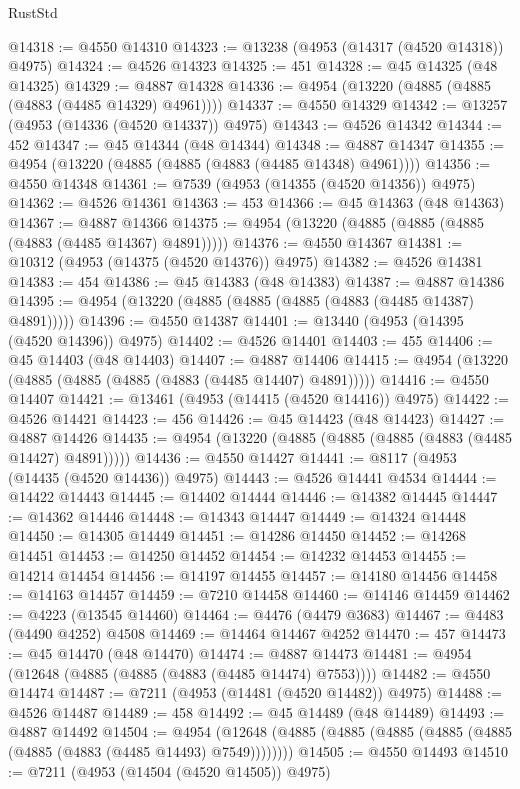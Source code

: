 \begin{lexlean}{RustStd}
\begin{coremodule}
@14318 := @4550 @14310
@14323 := @13238 (@4953 (@14317 (@4520 @14318)) @4975)
@14324 := @4526 @14323
@14325 := 451
@14328 := @45 @14325 (@48 @14325)
@14329 := @4887 @14328
@14336 := @4954 (@13220 (@4885 (@4885 (@4883 (@4485 @14329) @4961))))
@14337 := @4550 @14329
@14342 := @13257 (@4953 (@14336 (@4520 @14337)) @4975)
@14343 := @4526 @14342
@14344 := 452
@14347 := @45 @14344 (@48 @14344)
@14348 := @4887 @14347
@14355 := @4954 (@13220 (@4885 (@4885 (@4883 (@4485 @14348) @4961))))
@14356 := @4550 @14348
@14361 := @7539 (@4953 (@14355 (@4520 @14356)) @4975)
@14362 := @4526 @14361
@14363 := 453
@14366 := @45 @14363 (@48 @14363)
@14367 := @4887 @14366
@14375 := @4954 (@13220 (@4885 (@4885 (@4885 (@4883 (@4485 @14367) @4891)))))
@14376 := @4550 @14367
@14381 := @10312 (@4953 (@14375 (@4520 @14376)) @4975)
@14382 := @4526 @14381
@14383 := 454
@14386 := @45 @14383 (@48 @14383)
@14387 := @4887 @14386
@14395 := @4954 (@13220 (@4885 (@4885 (@4885 (@4883 (@4485 @14387) @4891)))))
@14396 := @4550 @14387
@14401 := @13440 (@4953 (@14395 (@4520 @14396)) @4975)
@14402 := @4526 @14401
@14403 := 455
@14406 := @45 @14403 (@48 @14403)
@14407 := @4887 @14406
@14415 := @4954 (@13220 (@4885 (@4885 (@4885 (@4883 (@4485 @14407) @4891)))))
@14416 := @4550 @14407
@14421 := @13461 (@4953 (@14415 (@4520 @14416)) @4975)
@14422 := @4526 @14421
@14423 := 456
@14426 := @45 @14423 (@48 @14423)
@14427 := @4887 @14426
@14435 := @4954 (@13220 (@4885 (@4885 (@4885 (@4883 (@4485 @14427) @4891)))))
@14436 := @4550 @14427
@14441 := @8117 (@4953 (@14435 (@4520 @14436)) @4975)
@14443 := @4526 @14441 @4534
@14444 := @14422 @14443
@14445 := @14402 @14444
@14446 := @14382 @14445
@14447 := @14362 @14446
@14448 := @14343 @14447
@14449 := @14324 @14448
@14450 := @14305 @14449
@14451 := @14286 @14450
@14452 := @14268 @14451
@14453 := @14250 @14452
@14454 := @14232 @14453
@14455 := @14214 @14454
@14456 := @14197 @14455
@14457 := @14180 @14456
@14458 := @14163 @14457
@14459 := @7210 @14458
@14460 := @14146 @14459
@14462 := @4223 (@13545 @14460)
@14464 := @4476 (@4479 @3683)
@14467 := @4483 (@4490 @4252) @4508
@14469 := @14464 @14467 @4252
@14470 := 457
@14473 := @45 @14470 (@48 @14470)
@14474 := @4887 @14473
@14481 := @4954 (@12648 (@4885 (@4885 (@4883 (@4485 @14474) @7553))))
@14482 := @4550 @14474
@14487 := @7211 (@4953 (@14481 (@4520 @14482)) @4975)
@14488 := @4526 @14487
@14489 := 458
@14492 := @45 @14489 (@48 @14489)
@14493 := @4887 @14492
@14504 := @4954
    (@12648 (@4885 (@4885 (@4885 (@4885 (@4885 (@4885 (@4883 (@4485 @14493) @7549))))))))
@14505 := @4550 @14493
@14510 := @7211 (@4953 (@14504 (@4520 @14505)) @4975)

\end{coremodule}
\end{lexlean}
